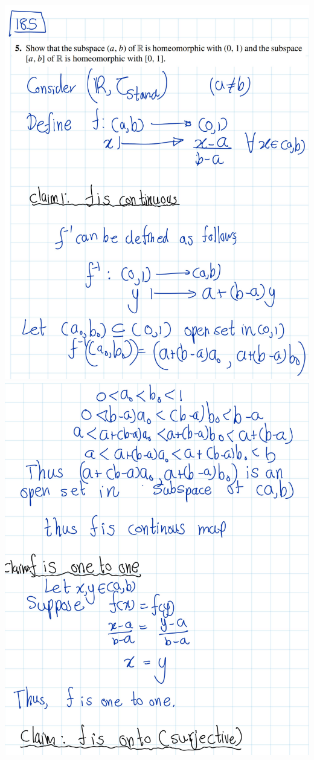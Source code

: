 \documentclass[
]{book}
\theoremstyle{definition}
\theoremstyle{definition}
\theoremstyle{definition}
\theoremstyle{definition}
\theoremstyle{remark}
\begin{document}
\includegraphics{figures/Exercises/Ex 2.18/ex-5-1.png}
\includegraphics{figures/Exercises/Ex 2.18/ex-5-2.png}
\end{document}
